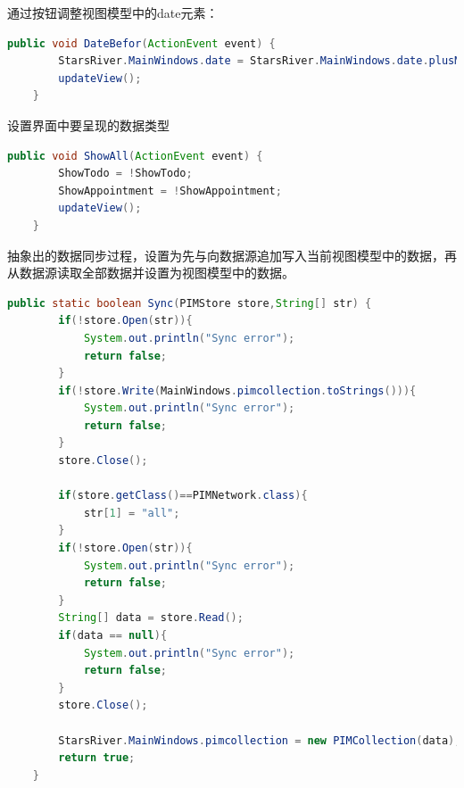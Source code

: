 \documentclass[a4paper]{article}
\begin{document}
    通过按钮调整视图模型中的date元素：
    \begin{lstlisting}[language=Java]
    public void DateBefor(ActionEvent event) {
        StarsRiver.MainWindows.date = StarsRiver.MainWindows.date.plusMonths(-1);
        updateView();
    }
    \end{lstlisting}

    设置界面中要呈现的数据类型
    \begin{lstlisting}[language=Java]
    public void ShowAll(ActionEvent event) {
        ShowTodo = !ShowTodo;
        ShowAppointment = !ShowAppointment;
        updateView();
    }
    \end{lstlisting}

    抽象出的数据同步过程，设置为先与向数据源追加写入当前视图模型中的数据，再从数据源读取全部数据并设置为视图模型中的数据。
    \begin{lstlisting}[language=Java]
    public static boolean Sync(PIMStore store,String[] str) {
        if(!store.Open(str)){
            System.out.println("Sync error");
            return false;
        }
        if(!store.Write(MainWindows.pimcollection.toStrings())){
            System.out.println("Sync error");
            return false;
        }
        store.Close();

        if(store.getClass()==PIMNetwork.class){
            str[1] = "all";
        }
        if(!store.Open(str)){
            System.out.println("Sync error");
            return false;
        }
        String[] data = store.Read();
        if(data == null){
            System.out.println("Sync error");
            return false;
        }
        store.Close();

        StarsRiver.MainWindows.pimcollection = new PIMCollection(data);
        return true;
    }
    \end{lstlisting}
\end{document}
